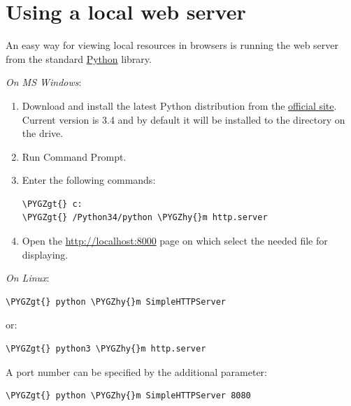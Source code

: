 \documentclass[a4paper,12pt,oneside]{sphinxmanual}
\def\PYGZgt{\char`\>}
\def\PYGZhy{\char`\-}
\begin{document}
\section{Using a local web server}
\label{problems_and_solutions:local-web-server}\label{problems_and_solutions:web}
An easy way for viewing local resources in browsers is running the web server from the standard \href{http://en.wikipedia.org/wiki/Python\_(programming\_language)}{Python} library.

\emph{On MS Windows}:
\begin{enumerate}
\item {} 
Download and install the latest Python distribution from the \href{http://www.python.org/download/releases/}{official site}. Current version is 3.4 and by default it will be installed to the  directory on the  drive.

\item {} 
Run Command Prompt.

\item {} 
Enter the following commands:

\begin{Verbatim}[commandchars=\\\{\}]
\PYGZgt{} c:
\PYGZgt{} /Python34/python \PYGZhy{}m http.server
\end{Verbatim}

\item {} 
Open the \href{http://localhost:8000}{http://localhost:8000} page on which select the needed file for displaying.

\end{enumerate}

\emph{On Linux}:

\begin{Verbatim}[commandchars=\\\{\}]
\PYGZgt{} python \PYGZhy{}m SimpleHTTPServer
\end{Verbatim}

or:

\begin{Verbatim}[commandchars=\\\{\}]
\PYGZgt{} python3 \PYGZhy{}m http.server
\end{Verbatim}

A port number can be specified by the additional parameter:

\begin{Verbatim}[commandchars=\\\{\}]
\PYGZgt{} python \PYGZhy{}m SimpleHTTPServer 8080
\end{Verbatim}
\end{document}

